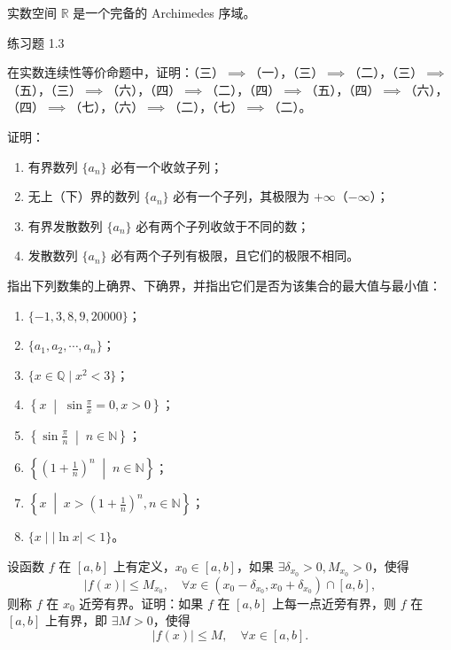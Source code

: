 \begin{axiom}[实数公理]\label{ax:real}
实数空间 $\mathbb{R}$ 是一个完备的 Archimedes 序域。
\end{axiom}

\begin{exblock}{练习题 1.3}
\item 在实数连续性等价命题中，证明：（三）$\implies$（一），（三）$\implies$（二），（三）$\implies$（五），（三）$\implies$（六），（四）$\implies$（二），（四）$\implies$（五），（四）$\implies$（六），（四）$\implies$（七），（六）$\implies$（二），（七）$\implies$（二）。

\item 证明：
\begin{enumerate}
  \item 有界数列 $\{a_n\}$ 必有一个收敛子列；
  \item 无上（下）界的数列 $\{a_n\}$ 必有一个子列，其极限为 $+\infty$（$-\infty$）；
  \item 有界发散数列 $\{a_n\}$ 必有两个子列收敛于不同的数；
  \item 发散数列 $\{a_n\}$ 必有两个子列有极限，且它们的极限不相同。
\end{enumerate}

\item 指出下列数集的上确界、下确界，并指出它们是否为该集合的最大值与最小值：
\begin{enumerate}
  \item $\{-1, 3, 8, 9, 20000\}$；
  \item $\{a_1, a_2, \cdots, a_n\}$；
  \item $\{x \in \mathbb{Q} \mid x^2 < 3\}$；
  \item $\left\{x \;\middle|\; \sin \frac{\pi}{x} = 0, x > 0\right\}$；
  \item $\left\{\sin \frac{\pi}{n} \;\middle|\; n \in \mathbb{N}\right\}$；
  \item $\left\{\left(1 + \frac{1}{n}\right)^n \;\middle|\; n \in \mathbb{N}\right\}$；
  \item $\left\{x \;\middle|\; x > \left(1 + \frac{1}{n}\right)^n, n \in \mathbb{N}\right\}$；
  \item $\{x \mid |\ln x| < 1\}$。
\end{enumerate}

\item 设函数 $f$ 在 $[a,b]$ 上有定义，$x_0 \in [a,b]$，如果 $\exists \delta_{x_0} > 0, M_{x_0} > 0$，使得
\[
|f(x)| \leqslant M_{x_0},\quad \forall x \in (x_0 - \delta_{x_0}, x_0 + \delta_{x_0}) \cap [a,b],
\]
则称 $f$ 在 $x_0$ 近旁有界。证明：如果 $f$ 在 $[a,b]$ 上每一点近旁有界，则 $f$ 在 $[a,b]$ 上有界，即 $\exists M > 0$，使得
\[
|f(x)| \leqslant M,\quad \forall x \in [a,b].
\]


\end{exblock}
